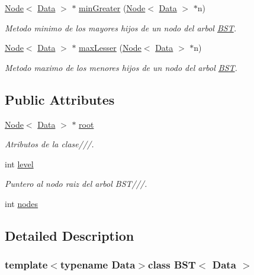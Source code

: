 \begin{DoxyCompactItemize}
\hyperlink{class_node}{Node}$<$ \hyperlink{class_data}{Data} $>$ $\ast$ \hyperlink{class_b_s_t_a4a1bb86c1c7c9ba57885800541b82f24}{min\+Greater} (\hyperlink{class_node}{Node}$<$ \hyperlink{class_data}{Data} $>$ $\ast$n)
\begin{DoxyCompactList}\small\item\em Metodo minimo de los mayores hijos de un nodo del arbol \hyperlink{class_b_s_t}{B\+S\+T}. \end{DoxyCompactList}\item 
\hyperlink{class_node}{Node}$<$ \hyperlink{class_data}{Data} $>$ $\ast$ \hyperlink{class_b_s_t_ac9bfcea57b211a7da89b3eb6efb5cbe0}{max\+Lesser} (\hyperlink{class_node}{Node}$<$ \hyperlink{class_data}{Data} $>$ $\ast$n)
\begin{DoxyCompactList}\small\item\em Metodo maximo de los menores hijos de un nodo del arbol \hyperlink{class_b_s_t}{B\+S\+T}. \end{DoxyCompactList}\end{DoxyCompactItemize}
\subsection*{Public Attributes}
\begin{DoxyCompactItemize}
\item 
\hyperlink{class_node}{Node}$<$ \hyperlink{class_data}{Data} $>$ $\ast$ \hyperlink{class_b_s_t_ae9208b0d67c10cd0452bdef9b8fd2669}{root}
\begin{DoxyCompactList}\small\item\em Atributos de la clase///. \end{DoxyCompactList}\item 
int \hyperlink{class_b_s_t_ab7d2c494210429a912857968faabbcf5}{level}
\begin{DoxyCompactList}\small\item\em Puntero al nodo raiz del arbol B\+S\+T///. \end{DoxyCompactList}\item 
int \hyperlink{class_b_s_t_adc23f51220d43a63e6b34a80fc9e6932}{nodes}
\end{DoxyCompactItemize}


\subsection{Detailed Description}
\subsubsection*{template$<$typename Data$>$class B\+S\+T$<$ Data $>$}



